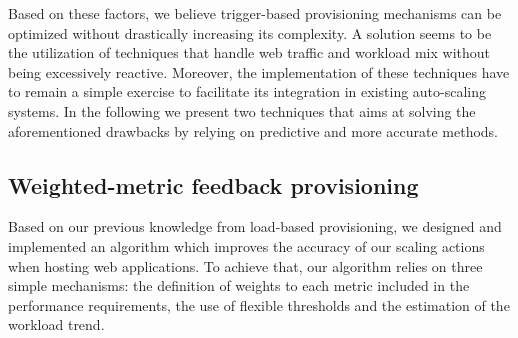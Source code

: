 Based on these factors, we believe trigger-based provisioning mechanisms can be optimized without drastically increasing its complexity. A solution seems to be the utilization of techniques that handle web traffic and workload mix without being excessively reactive. Moreover, the implementation of these techniques have to remain a simple exercise to facilitate its integration in existing auto-scaling systems. In the following we present two techniques that aims at solving the aforementioned drawbacks by relying on predictive and more accurate methods.







\subsection{Weighted-metric feedback provisioning}
Based on our previous knowledge from load-based provisioning, we designed and implemented an algorithm which improves the accuracy of our scaling actions when hosting web applications. To achieve that, our algorithm relies on three simple mechanisms: the definition of weights to each metric included in the performance requirements, the use of flexible thresholds and the estimation of the workload trend. 

\vspace{2mm}

